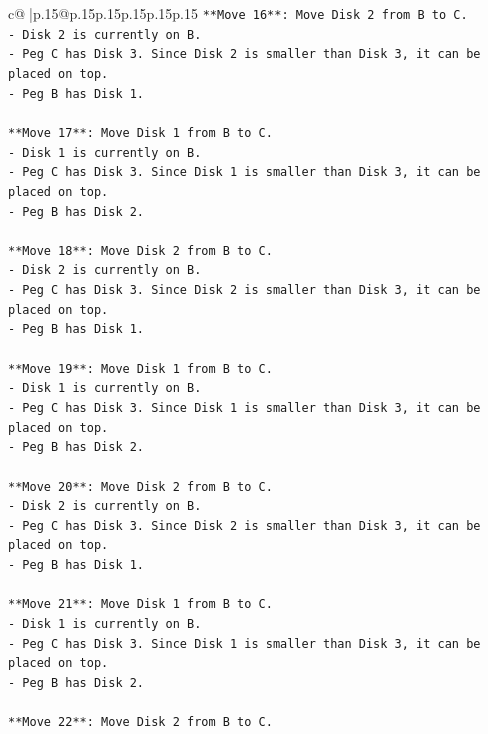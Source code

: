 \documentclass{article}
\begin{document}
{\begin{supertabular}{c@{$\;$}|p{.15\linewidth}@{}p{.15\linewidth}p{.15\linewidth}p{.15\linewidth}p{.15\linewidth}p{.15\linewidth}}
{{{\texttt{**Move 16**: Move Disk 2 from B to C.} \\
\texttt{{-} Disk 2 is currently on B.} \\
\texttt{{-} Peg C has Disk 3. Since Disk 2 is smaller than Disk 3, it can be placed on top.} \\
\texttt{{-} Peg B has Disk 1.} \\
\\ 
\texttt{**Move 17**: Move Disk 1 from B to C.} \\
\texttt{{-} Disk 1 is currently on B.} \\
\texttt{{-} Peg C has Disk 3. Since Disk 1 is smaller than Disk 3, it can be placed on top.} \\
\texttt{{-} Peg B has Disk 2.} \\
\\ 
\texttt{**Move 18**: Move Disk 2 from B to C.} \\
\texttt{{-} Disk 2 is currently on B.} \\
\texttt{{-} Peg C has Disk 3. Since Disk 2 is smaller than Disk 3, it can be placed on top.} \\
\texttt{{-} Peg B has Disk 1.} \\
\\ 
\texttt{**Move 19**: Move Disk 1 from B to C.} \\
\texttt{{-} Disk 1 is currently on B.} \\
\texttt{{-} Peg C has Disk 3. Since Disk 1 is smaller than Disk 3, it can be placed on top.} \\
\texttt{{-} Peg B has Disk 2.} \\
\\ 
\texttt{**Move 20**: Move Disk 2 from B to C.} \\
\texttt{{-} Disk 2 is currently on B.} \\
\texttt{{-} Peg C has Disk 3. Since Disk 2 is smaller than Disk 3, it can be placed on top.} \\
\texttt{{-} Peg B has Disk 1.} \\
\\ 
\texttt{**Move 21**: Move Disk 1 from B to C.} \\
\texttt{{-} Disk 1 is currently on B.} \\
\texttt{{-} Peg C has Disk 3. Since Disk 1 is smaller than Disk 3, it can be placed on top.} \\
\texttt{{-} Peg B has Disk 2.} \\
\\ 
\texttt{**Move 22**: Move Disk 2 from B to C.} \\
}}}
\end{supertabular}}
\end{document}

